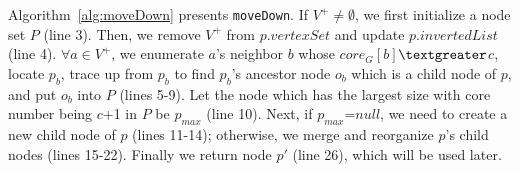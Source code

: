 
Algorithm~\ref{alg:moveDown} presents {\tt moveDown}.
If $V^+$$\neq\emptyset$, we first initialize a node set $P$ (line 3).
Then, we remove $V^+$ from $p.vertexSet$ and update $p.invertedList$ (line 4).
$\forall$$a\in V^+$, we enumerate $a$'s neighbor $b$ whose $core_G[b]$$\textgreater$$c$,
locate $p_b$, trace up from $p_b$ to find $p_b$'s ancestor node $o_b$ which is a child node of $p$,
and put $o_b$ into $P$ (lines 5-9).
Let the node which has the largest size with core number being $c$+1 in $P$ be $p_{max}$ (line 10).
Next, if $p_{max}$=$null$, we need to create a new child node of $p$ (lines 11-14);
otherwise, we merge and reorganize $p$'s child nodes (lines 15-22).
Finally we return node $p'$ (line 26), which will be used later.

